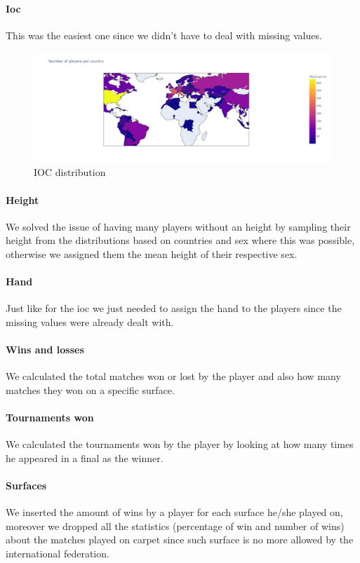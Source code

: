 \paragraph{Ioc} This was the easiest one since we didn't have to deal with missing values.
\begin{figure}[H]
    \centering
    \includegraphics[width=0.74\linewidth]{images/data_preparation/ioc_distribution.png}
    \caption{IOC distribution}
    \label{fig:ioc_feature}
\end{figure}

\paragraph{Height} We solved the issue of having many players without an height by sampling their height from the distributions based on countries and sex where this was possible, otherwise we assigned them the mean height of their respective sex.

\paragraph{Hand} Just like for the ioc we just needed to assign the hand to the players since the missing values were already dealt with.

\paragraph{Wins and losses} We calculated the total matches won or lost by the player and also how many matches they won on a specific surface.

\paragraph{Tournaments won} We calculated the tournaments won by the player by looking at how many times he appeared in a final as the winner.

\paragraph{Surfaces} We inserted the amount of wins by a player for each surface he/she played on, moreover we dropped all the statistics (percentage of win and number of wins) about the matches played on carpet since such surface is no more allowed by the international federation.

